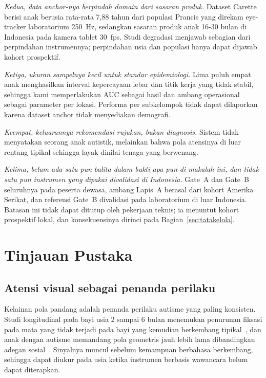 \documentclass{article}
\begin{document}
\emph{Kedua, data anchor-nya berpindah domain dari sasaran produk.} Dataset Carette berisi
anak berusia rata-rata 7,88 tahun dari populasi Prancis yang direkam eye-tracker laboratorium
250~Hz, sedangkan sasaran produk anak 16-30 bulan di Indonesia pada kamera tablet 30~fps.
Studi degradasi menjawab sebagian dari perpindahan instrumennya; perpindahan usia dan
populasi hanya dapat dijawab kohort prospektif.

\emph{Ketiga, ukuran sampelnya kecil untuk standar epidemiologi.} Lima puluh empat anak
menghasilkan interval kepercayaan lebar dan titik kerja yang tidak stabil, sehingga kami
memperlakukan AUC sebagai hasil dan ambang operasional sebagai parameter per lokasi. Performa
per subkelompok tidak dapat dilaporkan karena dataset anchor tidak menyediakan demografi.

\emph{Keempat, keluarannya rekomendasi rujukan, bukan diagnosis.} Sistem tidak menyatakan
seorang anak autistik, melainkan bahwa pola atensinya di luar rentang tipikal sehingga layak
dinilai tenaga yang berwenang.

\emph{Kelima, belum ada satu pun balita dalam bukti apa pun di makalah ini, dan tidak satu
pun instrumen yang dipakai divalidasi di Indonesia.} Gate~A dan Gate~B seluruhnya pada
peserta dewasa, ambang Lapis~A berasal dari kohort Amerika Serikat, dan referensi Gate~B
divalidasi pada laboratorium di luar Indonesia. Batasan ini tidak dapat ditutup oleh
pekerjaan teknis; ia menuntut kohort prospektif lokal, dan konsekuensinya dirinci pada
Bagian~\ref{sec:tatakelola}.

\section{Tinjauan Pustaka}

\subsection{Atensi visual sebagai penanda perilaku}

Kelainan pola pandang adalah penanda perilaku autisme yang paling konsisten. Studi
longitudinal pada bayi usia 2 sampai 6 bulan menemukan penurunan fiksasi pada mata yang
tidak terjadi pada bayi yang kemudian berkembang tipikal~\cite{jones2013}, dan anak dengan
autisme memandang pola geometris jauh lebih lama dibandingkan adegan
sosial~\cite{pierce2011}. Sinyalnya muncul sebelum kemampuan berbahasa berkembang, sehingga
dapat diukur pada usia ketika instrumen berbasis wawancara belum dapat diterapkan.
\end{document}
